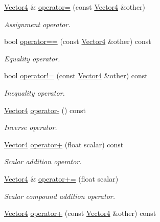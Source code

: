 \begin{DoxyCompactItemize}
\hyperlink{classchaos_1_1gfx_1_1_vector4}{Vector4} \& \hyperlink{classchaos_1_1gfx_1_1_vector4_ad6b4eb3482cb75173ca23edd9f352930}{operator=} (const \hyperlink{classchaos_1_1gfx_1_1_vector4}{Vector4} \&other)
\begin{DoxyCompactList}\small\item\em Assignment operator. \end{DoxyCompactList}\item 
bool \hyperlink{classchaos_1_1gfx_1_1_vector4_add5671fb46f71d2196a68e2746309463}{operator==} (const \hyperlink{classchaos_1_1gfx_1_1_vector4}{Vector4} \&other) const 
\begin{DoxyCompactList}\small\item\em Equality operator. \end{DoxyCompactList}\item 
bool \hyperlink{classchaos_1_1gfx_1_1_vector4_ae0ac2f2346e0e56523f8f263286d3954}{operator!=} (const \hyperlink{classchaos_1_1gfx_1_1_vector4}{Vector4} \&other) const 
\begin{DoxyCompactList}\small\item\em Inequality operator. \end{DoxyCompactList}\item 
\hyperlink{classchaos_1_1gfx_1_1_vector4}{Vector4} \hyperlink{classchaos_1_1gfx_1_1_vector4_a214aefd2c36fb704f6a3e9a531e9b4c4}{operator-\/} () const 
\begin{DoxyCompactList}\small\item\em Inverse operator. \end{DoxyCompactList}\item 
\hyperlink{classchaos_1_1gfx_1_1_vector4}{Vector4} \hyperlink{classchaos_1_1gfx_1_1_vector4_aaa1fe6160bb530edada4723daa4276e0}{operator+} (float scalar) const 
\begin{DoxyCompactList}\small\item\em Scalar addition operator. \end{DoxyCompactList}\item 
\hyperlink{classchaos_1_1gfx_1_1_vector4}{Vector4} \& \hyperlink{classchaos_1_1gfx_1_1_vector4_a1ee838a2da3e2595838769850a4a945f}{operator+=} (float scalar)
\begin{DoxyCompactList}\small\item\em Scalar compound addition operator. \end{DoxyCompactList}\item 
\hyperlink{classchaos_1_1gfx_1_1_vector4}{Vector4} \hyperlink{classchaos_1_1gfx_1_1_vector4_ab6631a4c686e6878d8d4212369300372}{operator+} (const \hyperlink{classchaos_1_1gfx_1_1_vector4}{Vector4} \&other) const 

\end{DoxyCompactItemize}
